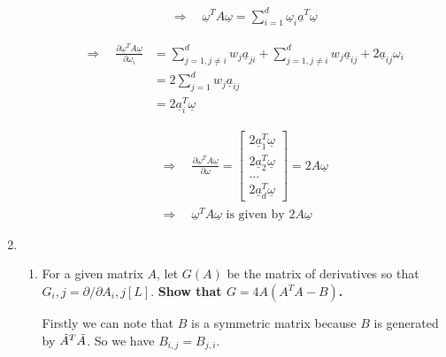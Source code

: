 \documentclass[11pt,letterpaper]{article}
\begin{document}
\begin{enumerate}
\begin{flushleft}
\begin{enumerate}
{            \begin{align*}
                \Rightarrow \quad \underline\omega^TA\underline\omega = \sum_{i=1}^d{
                    \underline\omega_i\underline a^T \underline\omega
                }
            \end{align*}

            \begin{align*}
                \Rightarrow \quad \frac{\partial \underline{\omega}^TA\underline\omega}{\partial \omega_i} 
                &= \sum_{j=1,j\neq i}^d{w_j\underline a_{ji}} + \sum_{j=1,j\neq i}^d{w_j\underline a_{ij}} + 2\underline a_{ij}\omega_i\\
                &= 2\sum_{j=1}^d{w_j\underline a_{ij}}\\
                &= 2\underline a_i^T\underline\omega
            \end{align*}
            \newpage

            \begin{align*}
                \Rightarrow \quad \frac{\partial \underline{\omega}^TA\underline\omega}{\partial \omega} = \begin{bmatrix}
                            2\underline a_1^T \underline\omega \\
                            2\underline a_2^T \underline\omega \\
                            \dots \\
                            2\underline a_d^T \underline\omega 
                        \end{bmatrix} = 2A\underline\omega \\
                \Rightarrow \quad \underline{\omega}^TA\underline\omega \text{ is given by } 2A\underline\omega
            \end{align*}
    }
    \end{enumerate}
\end{flushleft}
\newpage
\item \begin{enumerate}
    \item For a given matrix $A$, let $G(A)$ be the matrix of derivatives so that $G_i,j = \partial/\partial A_i,j[L]$. \textbf{Show that $G = 4A(A^TA-B)$.} 
    \begin{flushleft}
        \justifying
        Firstly we can note that $B$ is a symmetric matrix because $B$ is generated by $\Tilde{A} ^T \Tilde{A}$. So we have $B_{i,j} = B_{j,i}$.
    \end{flushleft}
    

\end{enumerate}
\end{enumerate}
\end{document}
